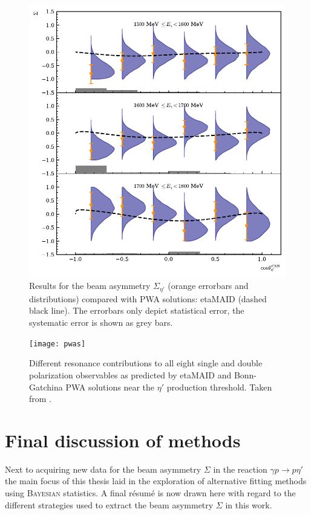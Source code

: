 \begin{figure}[htbp]
\centering
\includegraphics[width=\linewidth]{../bayes/etap_event_based_fit/plots/sigma_etap_pwa.pdf}
\caption{Results for the beam asymmetry $\Sigma_{\eta'}$ (orange errorbars and distributions) compared with PWA solutions:  etaMAID \cite{etaMAID,pwa_online} (dashed black line). The errorbars only depict statistical error, the systematic error is shown as grey bars.}
\label{fig:pwa}
\end{figure}

\begin{figure}[htbp]
	\centering
	\texttt{[image: pwas]}
	\caption{Different resonance contributions to all eight single and double polarization observables as predicted by etaMAID \cite{etaMAID} and Bonn-Gatchina \cite{etap_bnga} PWA solutions near the $\eta'$ production threshold. Taken from \cite{etaMAID}.}
	\label{fig:pwas}
\end{figure} 
\section{Final discussion of methods}
Next to acquiring new data for the beam asymmetry $\Sigma$ in the reaction $\gamma p\to p\eta'$ the main focus of this thesis laid in the exploration of alternative fitting methods using \textsc{Bayesian} statistics. A final r\'{e}sum\'{e} is now drawn here with regard to the different strategies used to extract the beam asymmetry $\Sigma$ in this work.

